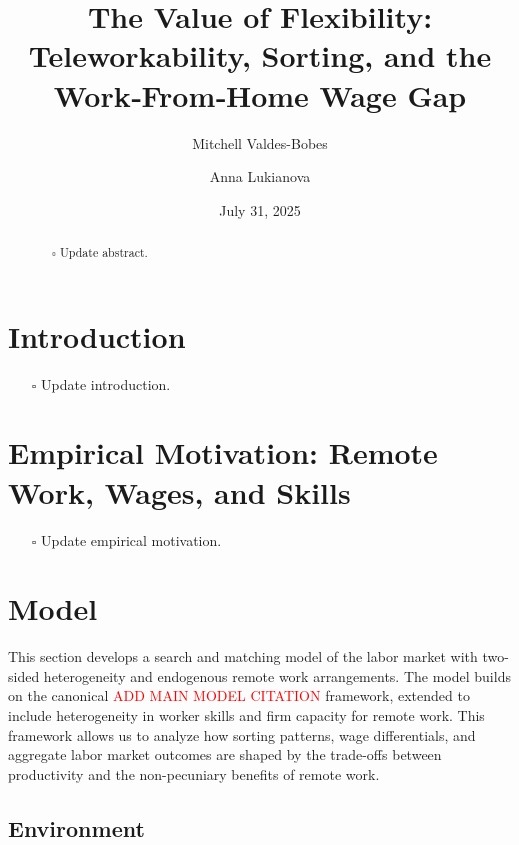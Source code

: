 \documentclass[
  11pt,
  letterpaper,
  DIV=11,
  numbers=noendperiod]{scrartcl}
\title{The Value of Flexibility: Teleworkability, Sorting, and the
Work‑From‑Home Wage Gap}
\author{Mitchell Valdes-Bobes \and Anna Lukianova}
\date{July 31, 2025}
\providecommand{\tightlist}{%
  \setlength{\itemsep}{0pt}\setlength{\parskip}{0pt}}\usepackage{longtable,booktabs,array}
\begin{document}
\maketitle
\begin{abstract}
\begin{itemize}
\tightlist
\item[$\square$]
  Update abstract.
\end{itemize}
\end{abstract}


\section{Introduction}\label{introduction}

\begin{itemize}
\tightlist
\item[$\square$]
  Update introduction.
\end{itemize}

\section{Empirical Motivation: Remote Work, Wages, and
Skills}\label{empirical-motivation-remote-work-wages-and-skills}

\begin{itemize}
\tightlist
\item[$\square$]
  Update empirical motivation.
\end{itemize}

\section{Model}\label{model}

This section develops a search and matching model of the labor market
with two-sided heterogeneity and endogenous remote work arrangements.
The model builds on the canonical
\textcolor{red}{ADD MAIN MODEL CITATION} framework, extended to include
heterogeneity in worker skills and firm capacity for remote work. This
framework allows us to analyze how sorting patterns, wage differentials,
and aggregate labor market outcomes are shaped by the trade-offs between
productivity and the non-pecuniary benefits of remote work.

\subsection{Environment}\label{environment}
\end{document}
